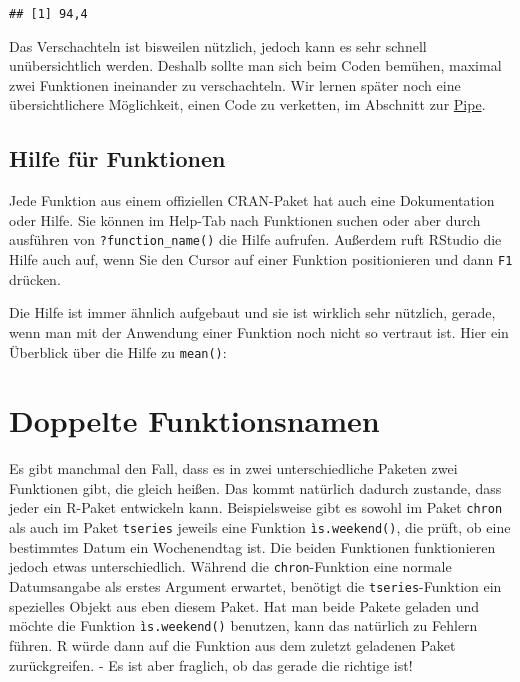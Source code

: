 \documentclass[
]{book}
\begin{document}
\begin{verbatim}
## [1] 94,4
\end{verbatim}

Das Verschachteln ist bisweilen nützlich, jedoch kann es sehr schnell unübersichtlich werden. Deshalb sollte man sich beim Coden bemühen, maximal zwei Funktionen ineinander zu verschachteln. Wir lernen später noch eine übersichtlichere Möglichkeit, einen Code zu verketten, im Abschnitt zur \protect\hyperlink{pipe}{Pipe}.

\hypertarget{hilfe-fuxfcr-funktionen}{%
\subsection{Hilfe für Funktionen}\label{hilfe-fuxfcr-funktionen}}

Jede Funktion aus einem offiziellen CRAN-Paket hat auch eine Dokumentation oder Hilfe. Sie können im Help-Tab nach Funktionen suchen oder aber durch ausführen von \texttt{?function\_name()} die Hilfe aufrufen. Außerdem ruft RStudio die Hilfe auch auf, wenn Sie den Cursor auf einer Funktion positionieren und dann \texttt{F1} drücken.

Die Hilfe ist immer ähnlich aufgebaut und sie ist wirklich sehr nützlich, gerade, wenn man mit der Anwendung einer Funktion noch nicht so vertraut ist. Hier ein Überblick über die Hilfe zu \texttt{mean()}:

\hypertarget{doppelte-funktionsnamen}{%
\section{Doppelte Funktionsnamen}\label{doppelte-funktionsnamen}}

Es gibt manchmal den Fall, dass es in zwei unterschiedliche Paketen zwei Funktionen gibt, die gleich heißen. Das kommt natürlich dadurch zustande, dass jeder ein R-Paket entwickeln kann. Beispielsweise gibt es sowohl im Paket \texttt{chron} als auch im Paket \texttt{tseries} jeweils eine Funktion \texttt{ìs.weekend()}, die prüft, ob eine bestimmtes Datum ein Wochenendtag ist. Die beiden Funktionen funktionieren jedoch etwas unterschiedlich. Während die \texttt{chron}-Funktion eine normale Datumsangabe als erstes Argument erwartet, benötigt die \texttt{tseries}-Funktion ein spezielles Objekt aus eben diesem Paket. Hat man beide Pakete geladen und möchte die Funktion \texttt{ìs.weekend()} benutzen, kann das natürlich zu Fehlern führen. R würde dann auf die Funktion aus dem zuletzt geladenen Paket zurückgreifen. - Es ist aber fraglich, ob das gerade die richtige ist!
\end{document}

